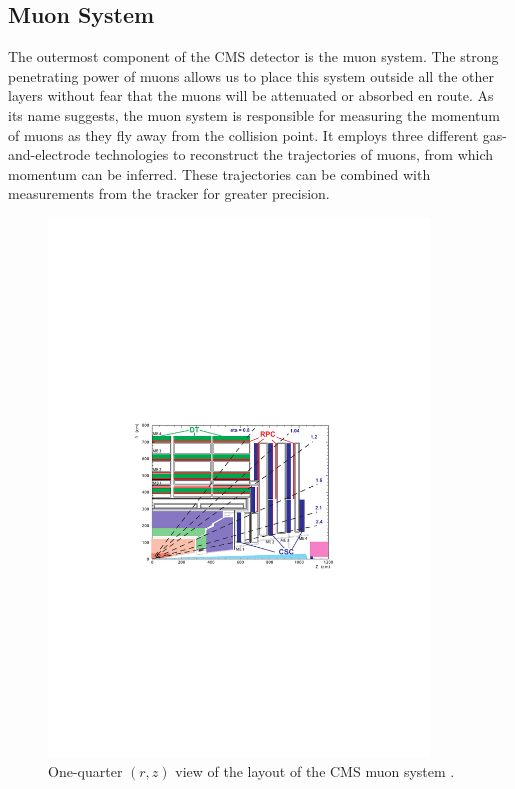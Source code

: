 \subsection{Muon System}
\label{ssec:cms:components:muon}

The outermost component of the CMS detector is the muon system. The
strong penetrating power of muons allows us to place this system
outside all the other layers without fear that the muons will be
attenuated or absorbed en route. As its name suggests, the muon system is
responsible for measuring the momentum of muons as they fly away from
the collision point. It employs three different gas-and-electrode
technologies to reconstruct the trajectories of muons, from which
momentum can be inferred. These trajectories can be combined with
measurements from the tracker for greater precision.

\begin{figure}[htb]
\centering
\includegraphics[width=0.9\textwidth]{figures/muon-layout.pdf}
\caption[One-quarter $(r,z)$ view of the layout of the CMS muon
system.]{One-quarter $(r,z)$ view of the layout of the CMS muon system
  \cite{tdr}.}
\label{fig:cms:muon}
\end{figure}

